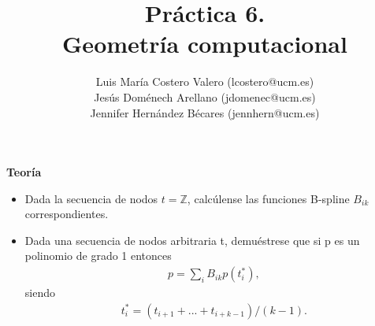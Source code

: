 \documentclass[12pt,a4paper]{article}
\title{Práctica 6. \\ Geometría computacional}
\author{Luis María Costero Valero (lcostero@ucm.es)\\ Jesús Doménech
  Arellano (jdomenec@ucm.es) \\ Jennifer Hernández Bécares (jennhern@ucm.es)}
\date{}
\begin{document}
\maketitle
\onehalfspace

\begin{center}
  {\large \textbf{Teoría}}
\end{center}
\begin{itemize}
\item Dada la secuencia de nodos $t=\mathbb{Z}$, calcúlense las
  funciones B-spline $B_{ik}$ correspondientes.
\item Dada una secuencia de nodos arbitraria t, demuéstrese
  que si p es un polinomio de grado 1 entonces
  \begin{align*}
    p = \sum_{i}B_{ik}p(t_{i}^{*}),
  \end{align*}
  siendo
  \begin{align*}
    t_{i}^{*}=(t_{i+1}+...+t_{i+k-1})/(k-1).
  \end{align*}
\end{itemize} 
\end{document}
